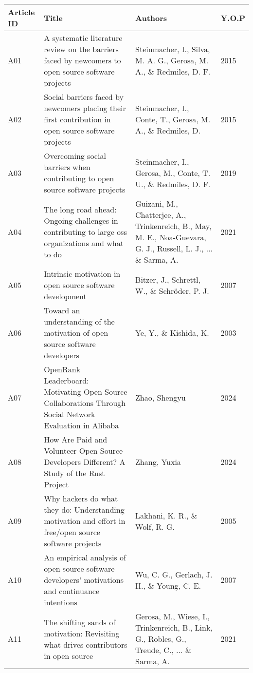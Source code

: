 \begin{landscape}
\begin{center}
\begin{longtable}{ | m{5em} | m{25em}| m{22em} | m{4em} | }
  \hline
 Article ID & Title & Authors & Y.O.P \\ 
  \hline
  A01           & A systematic literature review on the barriers faced by newcomers to open source software projects & Steinmacher, I., Silva, M. A. G., Gerosa, M. A., \& Redmiles, D. F. & 2015 \\ \hline
 A02           & Social barriers faced by newcomers placing their first contribution in open source software projects & Steinmacher, I., Conte, T., Gerosa, M. A., \& Redmiles, D.  & 2015                \\
  \hline
  A03           & Overcoming social barriers when contributing to open source software projects                         & Steinmacher, I., Gerosa, M., Conte, T. U., \& Redmiles, D. F.  & 2019         \\
  \hline
  A04           & The long road ahead: Ongoing challenges in contributing to large oss organizations and what to do    & Guizani, M., Chatterjee, A., Trinkenreich, B., May, M. E., Noa-Guevara, G. J., Russell, L. J., ... \& Sarma, A. & 2021    \\
  \hline
  A05           & Intrinsic motivation in open source software development                                               & Bitzer, J., Schrettl, W., \& Schröder, P. J.                  & 2007                \\
  \hline
  A06           & Toward an understanding of the motivation of open source software developers                          & Ye, Y., \& Kishida, K.                                        & 2003                \\ \hline
A07           & OpenRank Leaderboard: Motivating Open Source Collaborations Through Social Network Evaluation in Alibaba & Zhao, Shengyu & 2024 \\ \hline 
A08           & How Are Paid and Volunteer Open Source Developers Different? A Study of the Rust Project & Zhang, Yuxia & 2024 \\ \hline
A09           & Why hackers do what they do: Understanding motivation and effort in free/open source software projects & Lakhani, K. R., \& Wolf, R. G.                                & 2005                \\ \hline
A10           & An empirical analysis of open source software developers' motivations and continuance intentions & Wu, C. G., Gerlach, J. H., \& Young, C. E. & 2007 \\ \hline
A11           & The shifting sands of motivation: Revisiting what drives contributors in open source                   & Gerosa, M., Wiese, I., Trinkenreich, B., Link, G., Robles, G., Treude, C., ... \& Sarma, A. & 2021 \\ \hline

\end{longtable}
\end{center}
\end{landscape}

